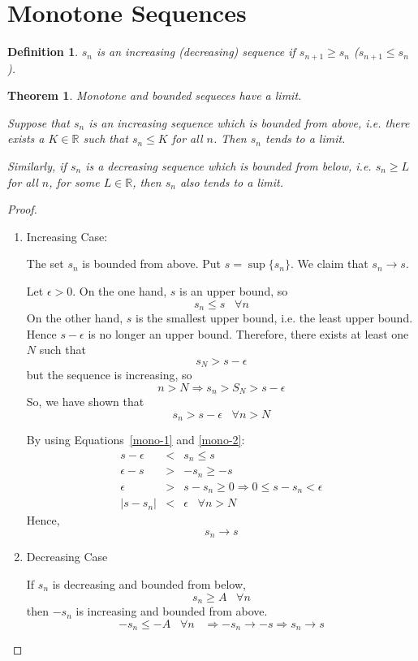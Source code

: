 \documentclass[12pt]{scrbook}
\newtheorem*{definition}{Definition}
\newtheorem{theorem}{Theorem}[section]
\begin{document}
\section{Monotone Sequences}

\begin{definition}
$s_n$ is an increasing (decreasing) sequence if $s_{n+1} \ge s_n$ ($s_{n+1} \le s_n$).
\end{definition}

\begin{theorem}
\label{monotone}
Monotone and bounded sequeces have a limit.

Suppose that $s_n$ is an increasing sequence which is bounded from above, i.e. there exists a $K \in \mathbb{R}$
such that $s_n \le K$ for all $n$.  Then $s_n$ tends to a limit.

Similarly, if $s_n$ is a decreasing sequence which is bounded from below, i.e. $s_n \ge L$ for all $n$, for some
$L \in \mathbb{R}$, then $s_n$ also tends to a limit.
\end{theorem}

\begin{proof}
\begin{enumerate}
\item Increasing Case:

The set $s_n$ is bounded from above.  Put $s = \sup\{s_n\}$.  We claim that $s_n \rightarrow s$.

Let $\epsilon > 0$.  On the one hand, $s$ is an upper bound, so
\begin{equation}
\label{mono-1}
s_n \le s \;\;\; \forall n
\end{equation}
On the other hand, $s$ is the smallest upper bound, i.e. the least upper bound.  Hence $s - \epsilon$ is no longer
an upper bound.  Therefore, there exists at least one $N$ such that 
\[ s_N > s - \epsilon \]
but the sequence is increasing, so
\[ n > N \Rightarrow s_n > S_N > s - \epsilon \]
So, we have shown that 
\begin{equation}
\label{mono-2}
s_n > s - \epsilon \;\;\; \forall n > N
\end{equation}

By using Equations~\ref{mono-1} and \ref{mono-2}:
\begin{eqnarray*}
s - \epsilon &<& s_n \le s  \\
\epsilon - s &>& -s_n \ge -s  \\
\epsilon &>& s - s_n \ge 0 \Rightarrow 0 \le s - s_n < \epsilon \\
|s - s_n| &<& \epsilon \;\;\; \forall n > N
\end{eqnarray*}
Hence, 
\[ s_n \rightarrow s \]

\item Decreasing Case

If $s_n$ is decreasing and bounded from below, 
\[ s_n \ge A \;\;\; \forall n \]
then $-s_n$ is increasing and bounded from above.  
\[ -s_n \le -A \;\;\; \forall n \;\;\; \Rightarrow -s_n \rightarrow -s \Rightarrow s_n \rightarrow s \]

\end{enumerate}
\end{proof}
\end{document}
